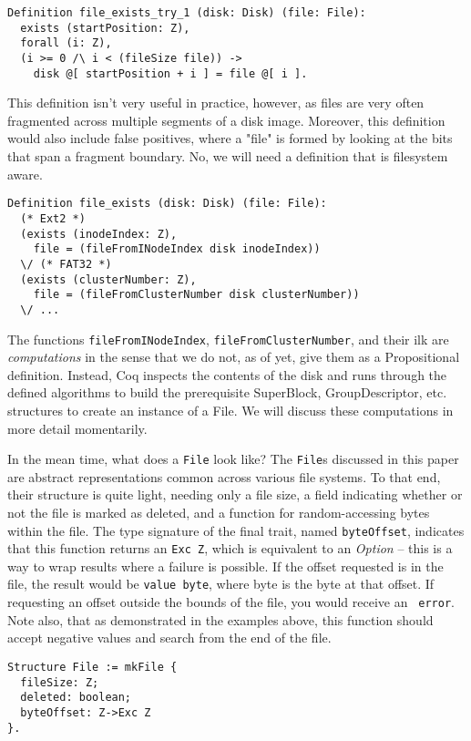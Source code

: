 \documentclass[nocopyrightspace]{sigplanconf}
\begin{document}
\begin{lstlisting}
Definition file_exists_try_1 (disk: Disk) (file: File):
  exists (startPosition: Z),
  forall (i: Z),
  (i >= 0 /\ i < (fileSize file)) -> 
    disk @[ startPosition + i ] = file @[ i ].
\end{lstlisting}

This definition isn't very useful in practice, however, as files are very
often fragmented across multiple segments of a disk image. Moreover, this
definition would also include false positives, where a "file" is formed by
looking at the bits that span a fragment boundary. No, we will need a
definition that is filesystem aware.

\begin{lstlisting}
Definition file_exists (disk: Disk) (file: File):
  (* Ext2 *)
  (exists (inodeIndex: Z), 
    file = (fileFromINodeIndex disk inodeIndex))
  \/ (* FAT32 *)
  (exists (clusterNumber: Z), 
    file = (fileFromClusterNumber disk clusterNumber))
  \/ ...
\end{lstlisting}

The functions {\tt fileFromINodeIndex}, {\tt fileFromClusterNumber}, and their
ilk are {\it computations} in the sense that we do not, as of yet, give them
as a Propositional definition. Instead, Coq inspects the contents of the disk
and runs through the defined algorithms to build the prerequisite SuperBlock,
GroupDescriptor, etc. structures to create an instance of a File. We will
discuss these computations in more detail momentarily.

In the mean time, what does a {\tt File} look like? The {\tt File}s discussed
in this paper are abstract representations common across various file systems.
To that end, their structure is quite light, needing only a file size, a field
indicating whether or not the file is marked as deleted, and a function for
random-accessing bytes within the file. The type signature of the final trait,
named {\tt byteOffset}, indicates that this function returns an {\tt Exc Z},
which is equivalent to an {\it Option} -- this is a way to wrap results where
a failure is possible. If the offset requested is in the file, the result
would be {\tt value byte}, where byte is the byte at that offset. If
requesting an offset outside the bounds of the file, you would receive an {\tt
error}. Note also, that as demonstrated in the examples above, this function
should accept negative values and search from the end of the file.

\begin{lstlisting}
Structure File := mkFile {
  fileSize: Z;
  deleted: boolean;
  byteOffset: Z->Exc Z
}.
\end{lstlisting}
\end{document}
